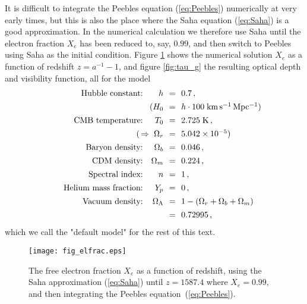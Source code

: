 \documentclass[twocolumn,nofootinbib,amsmath,amssymb]{revtex4}
\newcommand{\be}{\begin{equation}}
\newcommand{\ee}{\end{equation}}
\newcommand{\hs}{\hspace{-1.12mm}}
\newcommand{\eq}{\hs & = & \hs}
\newcommand{\vs}{\vspace{1.5mm}}
\newcommand{\kelvin}{\mathrm{K}}
\begin{document}
It is difficult to integrate the Peebles equation (\ref{eq:Peebles})
numerically at very early times, but this is also the place where the Saha
equation (\ref{eq:Saha}) is a good approximation. In the numerical calculation
we therefore use Saha until the electron fraction $X_e$ has been reduced to,
say, $0.99$, and then switch to Peebles using Saha as the initial condition.
Figure \ref{fig:electronfrac} shows the numerical solution $X_e$ as a function
of redshift $z = a^{-1} - 1$, and figure \ref{fig:tau_g} the resulting optical
depth and visibility function, all for the model
\be
  \begin{array}{rrcl}
    \mbox{Hubble constant:} & h \eq 0.7 \, , \vs \\
      & \hspace{-30mm} (H_0 \eq h \cdot 100 \;
        \mathrm{km \, s^{-1} \, Mpc^{-1}}) \hspace{-2mm} \vs \\
    \mbox{CMB temperature:} & T_0 \eq 2.725 \; \kelvin \, , \vs \\
      & \hspace{-30mm} (\, \Rightarrow \; \Omega_r \eq
        5.042 \times 10^{-5}) \vs \\
    \mbox{Baryon density:} & \Omega_b \eq 0.046 \, , \vs \\
    \mbox{CDM density:} & \Omega_m \eq 0.224 \, , \vs \\
    \mbox{Spectral index:} & n \eq 1 \, , \vs \\
    \mbox{Helium mass fraction:} & Y_p \eq 0 \, , \vs \\
    \mbox{Vacuum density:} & \Omega_\Lambda \eq
      1 - (\Omega_r + \Omega_b + \Omega_m) \vs \\
    & \eq 0.72995 \, ,
  \end{array} \hspace{-5mm}
  \label{eq:defaultmodel}
\ee
which we call the "default model" for the rest of this text.
\begin{figure}[!h]
  \begin{center}
    \texttt{[image: fig\_elfrac.eps]}
  \end{center}
  \vspace{-6mm}
  \caption{The free electron fraction $X_e$ as a function of redshift, using
  the Saha approximation (\ref{eq:Saha}) until $z =  1587.4$ where $X_e =
  0.99$, and then integrating the Peebles equation~(\ref{eq:Peebles}).}
  \label{fig:electronfrac}
\end{figure}
\end{document}

